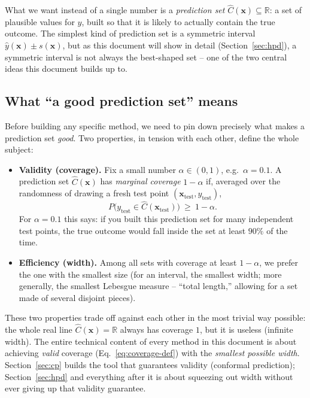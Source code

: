 \documentclass[11pt]{article}
\begin{document}
What we want instead of a single number is a \emph{prediction set} $\hat C(\bm x) \subseteq
\mathbb R$: a set of plausible values for $y$, built so that it is likely to actually contain the
true outcome. The simplest kind of prediction set is a symmetric interval $\hat y(\bm x) \pm
s(\bm x)$, but as this document will show in detail (Section~\ref{sec:hpd}), a symmetric interval
is not always the best-shaped set -- one of the two central ideas this document builds up to.

\subsection{What ``a good prediction set'' means}
\label{sec:coverage}

Before building any specific method, we need to pin down precisely what makes a prediction set
\emph{good}. Two properties, in tension with each other, define the whole subject:

\begin{itemize}[leftmargin=1.5em]
\item \textbf{Validity (coverage).} Fix a small number $\alpha \in (0,1)$, e.g.\ $\alpha=0.1$. A
prediction set $\hat C(\bm x)$ has \emph{marginal coverage} $1-\alpha$ if, averaged over the
randomness of drawing a fresh test point $(\bm x_{\mathrm{test}}, y_{\mathrm{test}})$,
\begin{equation}
P\big(y_{\mathrm{test}} \in \hat C(\bm x_{\mathrm{test}})\big) \ \ge\ 1-\alpha.
\label{eq:coverage-def}
\end{equation}
For $\alpha=0.1$ this says: if you built this prediction set for many independent test points,
the true outcome would fall inside the set at least $90\%$ of the time.
\item \textbf{Efficiency (width).} Among all sets with coverage at least $1-\alpha$, we prefer the
one with the smallest size (for an interval, the smallest width; more generally, the smallest
Lebesgue measure -- ``total length,'' allowing for a set made of several disjoint pieces).
\end{itemize}

These two properties trade off against each other in the most trivial way possible: the whole
real line $\hat C(\bm x) = \mathbb R$ always has coverage $1$, but it is useless (infinite width).
The entire technical content of every method in this document is about achieving \emph{valid}
coverage (Eq.~\ref{eq:coverage-def}) with the \emph{smallest possible width}. Section~\ref{sec:cp}
builds the tool that guarantees validity (conformal prediction); Section~\ref{sec:hpd} and
everything after it is about squeezing out width without ever giving up that validity guarantee.
\end{document}
